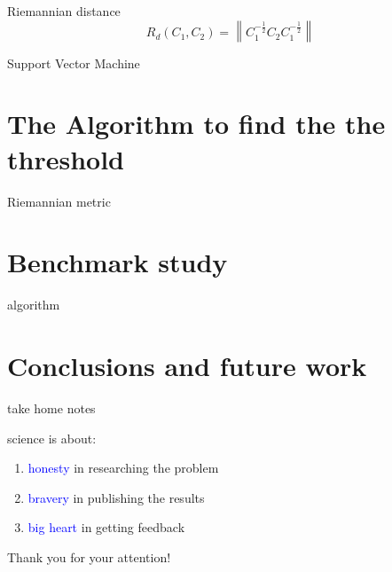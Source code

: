 \documentclass[10pt]{beamer}
\newcommand{\norm}[1]{\left\lVert#1\right\rVert}
\begin{document}
\begin{frame}{Riemannian distance}
    \begin{equation}
R_d(C_1,C_2) = \norm{ C_1^{-\frac{1}{2}}C_2C_1^{-\frac{1}{2}}}
    \end{equation} 
\end{frame}




\begin{frame}{Support Vector Machine}

\end{frame}


\section{The Algorithm to find the the threshold}


\begin{frame}{Riemannian metric}
\end{frame}


\section{Benchmark study}

\begin{frame}{algorithm}
    
\end{frame}



\section{Conclusions and future work}

\begin{frame}{take home notes}

\begin{center}science is about:\end{center}

\begin{center}
\begin{enumerate}
	\item \textcolor{blue}{honesty} in researching the problem
	\item \textcolor{blue}{bravery} in publishing the results 
    \item \textcolor{blue}{big heart} in getting feedback 
\end{enumerate}
\end{center}
\end{frame}

\begin{frame}[standout]
\begin{center}
Thank you for your attention!
\end{center}
\end{frame}
\end{document}
